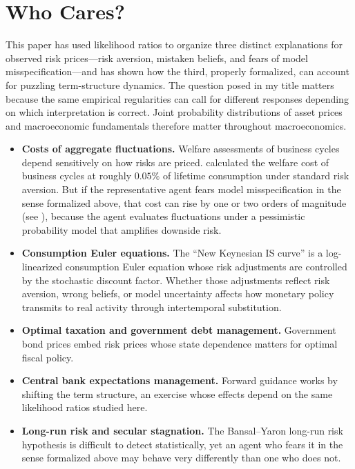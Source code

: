 \documentclass[12pt]{article}
\theoremstyle{definition}
\begin{document}
\section{Who Cares?}
\label{sec:conclusion}

This paper has used likelihood ratios to organize three distinct explanations for observed risk prices---risk aversion, mistaken beliefs, and fears of model misspecification---and has shown how the third, properly formalized, can account for puzzling term-structure dynamics.
The question posed in my  title matters because the same empirical regularities can call for different responses  depending on which interpretation is correct. Joint probability distributions of asset prices and macroeconomic fundamentals therefore matter throughout macroeconomics.

\begin{itemize}
\item \textbf{Costs of aggregate fluctuations.}  Welfare assessments of
      business cycles depend sensitively on how risks are priced.
      \citet{Lucas1987} calculated the welfare cost of business cycles at
      roughly $0.05\%$ of lifetime consumption under standard risk
      aversion.  But if the representative agent fears model
      misspecification in the sense formalized above, that cost can rise
      by one or two orders of magnitude (see \citep{HST1999}), because the agent evaluates fluctuations under a
      pessimistic probability model that amplifies downside risk.
\item \textbf{Consumption Euler equations.}  The ``New Keynesian IS
      curve'' is a log-linearized consumption Euler equation whose risk
      adjustments are controlled by the stochastic discount factor.
      Whether those adjustments reflect risk aversion, wrong beliefs, or model uncertainty affects how monetary policy transmits to real activity through intertemporal substitution.
\item \textbf{Optimal taxation and government debt management.}
       Government bond prices embed risk prices whose state dependence
       matters for optimal fiscal policy.
\item \textbf{Central bank expectations management.}  Forward guidance
      works by shifting the term structure, an exercise whose effects
      depend on the same likelihood ratios studied here.
\item \textbf{Long-run risk and secular stagnation.}  The Bansal--Yaron
      long-run risk hypothesis is difficult to detect statistically, yet
      an agent who fears it in the sense formalized above may behave
      very differently than one who does not.
\end{itemize}
\end{document}
